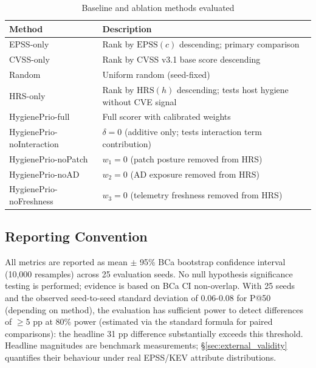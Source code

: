 \begin{table}[!t]
 \caption{Baseline and ablation methods evaluated}
 \label{tab:baselines}
 \centering
 \small
 \begin{tabular}{@{}p{2.8cm}p{5.3cm}@{}}
 \toprule
 \textbf{Method} & \textbf{Description} \\
 \midrule
 EPSS-only & Rank by $\mathrm{EPSS}(c)$ descending; primary comparison \\
 CVSS-only & Rank by CVSS v3.1 base score descending \\
 Random & Uniform random (seed-fixed) \\
 HRS-only & Rank by $\mathrm{HRS}(h)$ descending; tests host hygiene without CVE signal \\
 HygienePrio-full & Full scorer with calibrated weights \\
 HygienePrio-noInteraction & $\delta = 0$ (additive only; tests interaction term contribution) \\
 HygienePrio-noPatch & $w_1 = 0$ (patch posture removed from HRS) \\
 HygienePrio-noAD & $w_2 = 0$ (AD exposure removed from HRS) \\
 HygienePrio-noFreshness & $w_3 = 0$ (telemetry freshness removed from HRS) \\
 \bottomrule
 \end{tabular}
\end{table}

\subsection{Reporting Convention}

All metrics are reported as mean $\pm$ 95\% BCa bootstrap confidence interval~\cite{efron1994introduction} (10,000 resamples) across 25 evaluation seeds. No null hypothesis significance testing is performed; evidence is based on BCa CI non-overlap. With 25 seeds and the observed seed-to-seed standard deviation of 0.06-0.08 for P@50 (depending on method), the evaluation has sufficient power to detect differences of $\geq$5 pp at 80\% power (estimated via the standard formula for paired comparisons): the headline 31 pp difference substantially exceeds this threshold. Headline magnitudes are benchmark measurements; \S\ref{sec:external_validity} quantifies their behaviour under real EPSS/KEV attribute distributions.

